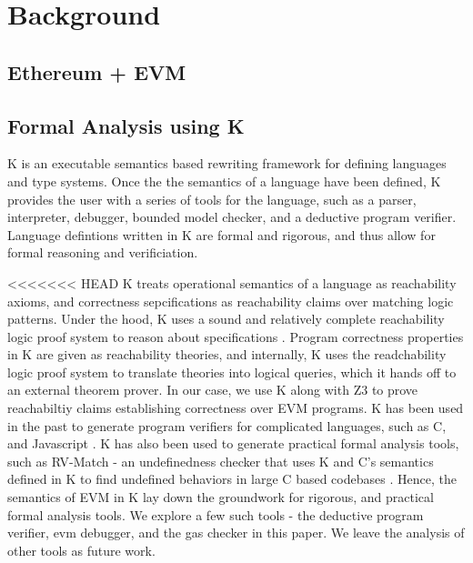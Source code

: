 \section{Background}
\subsection{Ethereum + EVM}
\subsection{Formal Analysis using K}
K is an executable semantics based rewriting framework for defining languages and type systems. Once the the semantics of a language have been defined, K provides the user with a series of tools for the language, such as a parser, interpreter, debugger, bounded model checker, and a deductive program verifier. Language defintions written in K are formal and rigorous, and thus allow for formal reasoning and verificiation.  

<<<<<<< HEAD
K treats operational semantics of a language as reachability axioms, and correctness sepcifications as reachability claims over matching logic patterns. Under the hood, K uses a sound and relatively complete reachability logic proof system to reason about specifications \cite{stefanescu-park-yuwen-li-rosu-2016-oopsla} \cite{stefanescu-ciobaca-mereuta-moore-serbanuta-rosu-2014-rta}. Program correctness properties in K are given as reachability theories, and internally, K uses the readchability logic proof system to translate theories into logical queries, which it hands off to an external theorem prover. In our case, we use K along with Z3 \cite{de2008z3} to prove reachabiltiy claims establishing correctness over EVM programs. K has been used in the past to generate program verifiers for complicated languages, such as C, and Javascript \cite{stefanescu-park-yuwen-li-rosu-2016-oopsla}. K has also been used to generate practical formal analysis tools, such as RV-Match - an undefinedness checker that uses K and C's semantics defined in K to find undefined behaviors in large C based codebases \cite{guth-hathhorn-saxena-rosu-2016-cav}. Hence, the semantics of EVM in K lay down the groundwork for rigorous, and practical formal analysis tools. We explore a few such tools - the deductive program verifier, evm debugger, and the gas checker in this paper. We leave the analysis of other tools as future work.
